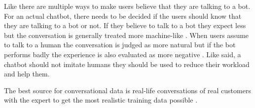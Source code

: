 Like \citet{GO2019304} there are multiple ways to make users believe that they are talking to a bot.
For an actual chatbot, there needs to be decided if the users should know that they are talking to a bot or not.
If they believe to talk to a bot they expect less but the conversation is generally treated more machine-like \cite{GO2019304}.
When users assume to talk to a human the conversation is judged as more natural but if the bot performs badly the experience is also evaluated as more negative \cite{GO2019304}.
Like \citet{shawar2007chatbots} said, a chatbot should not imitate humans they should be used to reduce their workload and help them.

The best source for conversational data is real-life conversations of real customers with the expert to get the most realistic training data possible \cite{singhbuilding}.